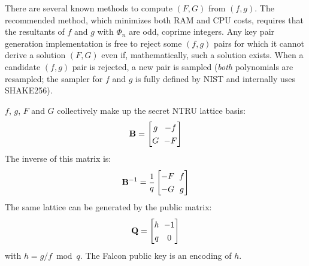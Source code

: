 \documentclass{llncs}
\begin{document}
There are several known methods to compute $(F, G)$ from $(f, g)$. The
recommended method, which minimizes both RAM and CPU
costs\cite{PorPre2019}, requires that the resultants of $f$ and $g$ with
$\Phi_n$ are odd, coprime integers. Any key pair generation
implementation is free to reject some $(f, g)$ pairs for which it cannot
derive a solution $(F, G)$ even if, mathematically, such a solution
exists. When a candidate $(f, g)$ pair is rejected, a new pair is
sampled (\emph{both} polynomials are resampled; the sampler for $f$ and
$g$ is fully defined by NIST and internally uses SHAKE256).

$f$, $g$, $F$ and $G$ collectively make up the secret NTRU lattice basis:
\begin{equation*}
    \renewcommand*{\arraystretch}{1.3}
    \setlength\arraycolsep{0.3em}
    \mathbf{B} = \begin{bmatrix}
        g & -f \\
        G & -F
    \end{bmatrix}
\end{equation*}
The inverse of this matrix is:
\begin{equation*}
    \renewcommand*{\arraystretch}{1.3}
    \setlength\arraycolsep{0.3em}
    \mathbf{B}^{-1} = \frac{1}{q} \begin{bmatrix}
        -F & f \\
        -G & g
    \end{bmatrix}
\end{equation*}
The same lattice can be generated by the public matrix:
\begin{equation*}
    \renewcommand*{\arraystretch}{1.3}
    \setlength\arraycolsep{0.3em}
    \mathbf{Q} = \begin{bmatrix}
        h & -1 \\
        q & 0 
    \end{bmatrix}
\end{equation*}
with $h = g/f \bmod q$. The Falcon public key is an encoding of $h$.
\end{document}

